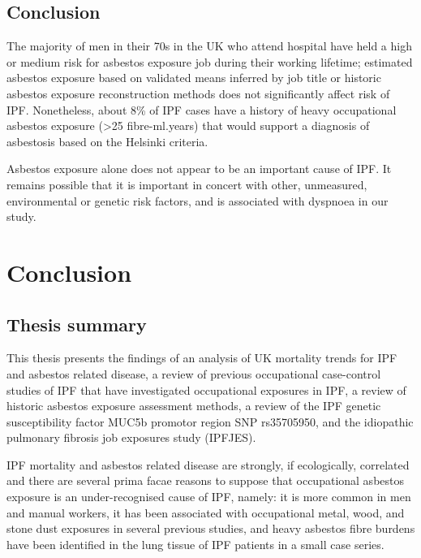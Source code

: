 \documentclass[
]{article}
\begin{document}
\hypertarget{conclusion-4}{%
\subsection{Conclusion}\label{conclusion-4}}

The majority of men in their 70s in the UK who attend hospital have held
a high or medium risk for asbestos exposure job during their working
lifetime; estimated asbestos exposure based on validated means inferred
by job title or historic asbestos exposure reconstruction methods does
not significantly affect risk of IPF. Nonetheless, about 8\% of IPF
cases have a history of heavy occupational asbestos exposure
(\textgreater25 fibre-ml.years) that would support a diagnosis of
asbestosis based on the Helsinki criteria.

Asbestos exposure alone does not appear to be an important cause of IPF.
It remains possible that it is important in concert with other,
unmeasured, environmental or genetic risk factors, and is associated
with dyspnoea in our study.

\hypertarget{conclusion-5}{%
\section{Conclusion}\label{conclusion-5}}

\hypertarget{thesis-summary}{%
\subsection{Thesis summary}\label{thesis-summary}}

This thesis presents the findings of an analysis of UK mortality trends
for IPF and asbestos related disease, a review of previous occupational
case-control studies of IPF that have investigated occupational
exposures in IPF, a review of historic asbestos exposure assessment
methods, a review of the IPF genetic susceptibility factor MUC5b
promotor region SNP rs35705950, and the idiopathic pulmonary fibrosis
job exposures study (IPFJES).

IPF mortality and asbestos related disease are strongly, if
ecologically, correlated and there are several prima facae reasons to
suppose that occupational asbestos exposure is an under-recognised cause
of IPF, namely: it is more common in men and manual workers, it has been
associated with occupational metal, wood, and stone dust exposures in
several previous studies, and heavy asbestos fibre burdens have been
identified in the lung tissue of IPF patients in a small case series.
\end{document}
